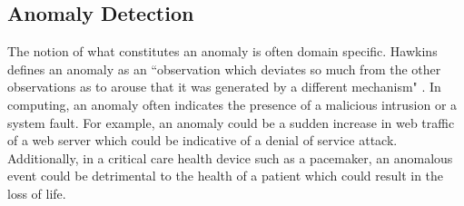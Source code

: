 \subsection{Anomaly Detection}

The notion of what constitutes an anomaly is often domain specific. Hawkins defines an anomaly as an ``observation which deviates so much from the other observations as to arouse that it was generated by a different mechanism" \cite{hawkins}. In computing, an anomaly often indicates the presence of a malicious intrusion or a system fault. For example, an anomaly could be a sudden increase in web traffic of a web server which could be indicative of a denial of service attack. Additionally, in a critical care health device such as a pacemaker, an anomalous event could be detrimental to the health of a patient which could result in the loss of life. 




